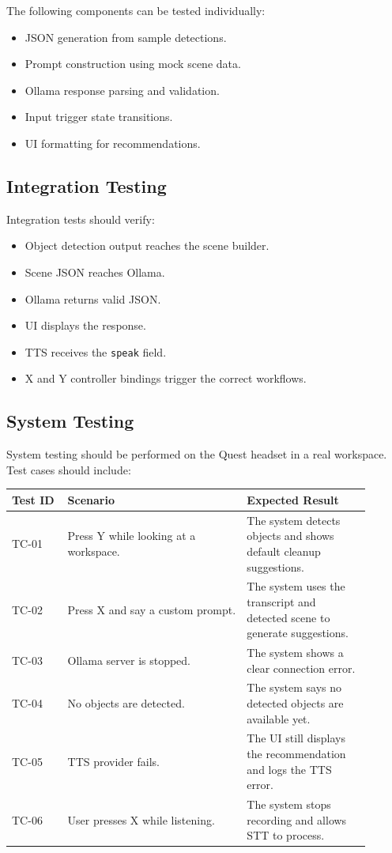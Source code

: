 \documentclass[12pt,a4paper]{article}
\begin{document}
The following components can be tested individually:

\begin{itemize}
    \item JSON generation from sample detections.
    \item Prompt construction using mock scene data.
    \item Ollama response parsing and validation.
    \item Input trigger state transitions.
    \item UI formatting for recommendations.
\end{itemize}

\subsection{Integration Testing}

Integration tests should verify:

\begin{itemize}
    \item Object detection output reaches the scene builder.
    \item Scene JSON reaches Ollama.
    \item Ollama returns valid JSON.
    \item UI displays the response.
    \item TTS receives the \texttt{speak} field.
    \item X and Y controller bindings trigger the correct workflows.
\end{itemize}

\subsection{System Testing}

System testing should be performed on the Quest headset in a real workspace. Test cases should include:

\begin{longtable}{p{0.14\linewidth} p{0.45\linewidth} p{0.31\linewidth}}
\toprule
\textbf{Test ID} & \textbf{Scenario} & \textbf{Expected Result}\\
\midrule
TC-01 & Press Y while looking at a workspace. & The system detects objects and shows default cleanup suggestions.\\
TC-02 & Press X and say a custom prompt. & The system uses the transcript and detected scene to generate suggestions.\\
TC-03 & Ollama server is stopped. & The system shows a clear connection error.\\
TC-04 & No objects are detected. & The system says no detected objects are available yet.\\
TC-05 & TTS provider fails. & The UI still displays the recommendation and logs the TTS error.\\
TC-06 & User presses X while listening. & The system stops recording and allows STT to process.\\
\bottomrule
\end{longtable}
\end{document}
